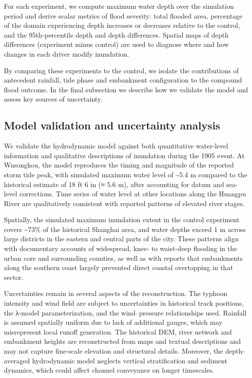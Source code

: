 \documentclass[
]{article}
\begin{document}
For each experiment, we compute maximum water depth over the simulation
period and derive scalar metrics of flood severity: total flooded area,
percentage of the domain experiencing depth increases or decreases
relative to the control, and the 95th-percentile depth and depth
differences. Spatial maps of depth differences (experiment minus
control) are used to diagnose where and how changes in each driver
modify inundation.

By comparing these experiments to the control, we isolate the
contributions of antecedent rainfall, tide phase and embankment
configuration to the compound flood outcome. In the final subsection we
describe how we validate the model and assess key sources of
uncertainty.

\subsection{\texorpdfstring{\textbf{Model validation and uncertainty
analysis}}{Model validation and uncertainty analysis}}\label{model-validation-and-uncertainty-analysis}

We validate the hydrodynamic model against both quantitative water-level
information and qualitative descriptions of inundation during the 1905
event. At Wusongkou, the model reproduces the timing and magnitude of
the reported storm tide peak, with simulated maximum water level of
\textasciitilde5.4 m compared to the historical estimate of 18 ft 6 in
(≈ 5.6 m), after accounting for datum and sea-level corrections. Time
series of water level at other locations along the Huangpu River are
qualitatively consistent with reported patterns of elevated river
stages.

Spatially, the simulated maximum inundation extent in the control
experiment covers \textasciitilde73\% of the historical Shanghai area,
and water depths exceed 1 m across large districts in the eastern and
central parts of the city. These patterns align with documentary
accounts of widespread, knee- to waist-deep flooding in the urban core
and surrounding counties, as well as with reports that embankments along
the southern coast largely prevented direct coastal overtopping in that
sector.

Uncertainties remain in several aspects of the reconstruction. The
typhoon intensity and wind field are subject to uncertainties in
historical track positions, the λ-model parameterization, and the
wind--pressure relationships used. Rainfall is assumed spatially uniform
due to lack of additional gauges, which may misrepresent local runoff
generation. The historical DEM, river network and embankment heights are
reconstructed from maps and textual descriptions and may not capture
fine-scale elevation and structural details. Moreover, the
depth-averaged hydrodynamic model neglects vertical stratification and
sediment dynamics, which could affect channel conveyance on longer
timescales.
\end{document}
